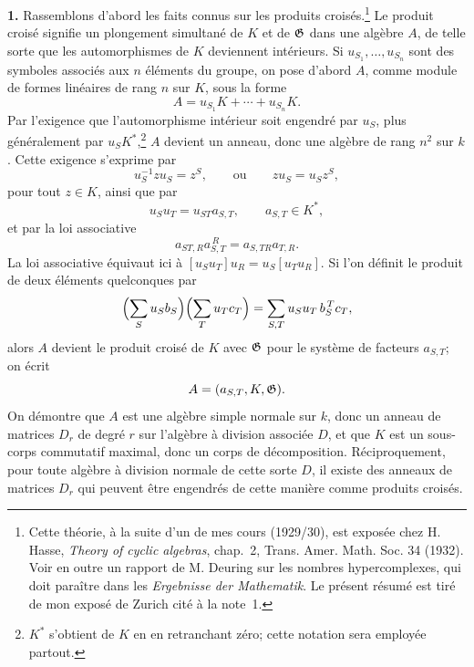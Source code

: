 \noindent\textbf{1.} Rassemblons d'abord les faits connus sur les produits croisés.\footnote{Cette théorie, à la suite d'un de mes cours (1929/30), est exposée chez H. Hasse, \emph{Theory of cyclic algebras}, chap.~2, Trans. Amer. Math. Soc. 34 (1932). Voir en outre un rapport de M. Deuring sur les nombres hypercomplexes, qui doit paraître dans les \emph{Ergebnisse der Mathematik}. Le présent résumé est tiré de mon exposé de Zurich cité à la note~1.} Le produit croisé signifie un plongement simultané de \(K\) et de \(\mathfrak G\) dans une algèbre \(A\), de telle sorte que les automorphismes de \(K\) deviennent intérieurs. Si \(u_{S_1},\ldots,u_{S_n}\) sont des symboles associés aux \(n\) éléments du groupe, on pose d'abord \(A\), comme module de formes linéaires de rang \(n\) sur \(K\), sous la forme
\[
        A=u_{S_1}K+\cdots+u_{S_n}K .                         \tag{1}
\]
Par l'exigence que l'automorphisme intérieur soit engendré par \(u_S\), plus généralement par \(u_S K^*\),\footnote{\(K^*\) s'obtient de \(K\) en en retranchant zéro; cette notation sera employée partout.} \(A\) devient un anneau, donc une algèbre de rang \(n^2\) sur \(k\). Cette exigence s'exprime par
\[
        u_S^{-1}zu_S=z^S,\qquad\text{ou}\qquad
        z u_S=u_S z^S,                                      \tag{2}
\]
pour tout \(z\in K\), ainsi que par
\[
        u_Su_T=u_{ST}a_{S,T},\qquad a_{S,T}\in K^*,           \tag{3}
\]
et par la loi associative
\[
        a_{ST,R}a_{S,T}^{\,R}=a_{S,TR}a_{T,R}.                \tag{4}
\]
La loi associative équivaut ici à \([u_Su_T]u_R=u_S[u_Tu_R]\).
Si l'on définit le produit de deux éléments quelconques par
\[
 \Bigl(\sum_S u_S b_S\Bigr)\Bigl(\sum_T u_T c_T\Bigr)
   =\sum_{S,T}u_Su_T\,b_S^{\,T}c_T ,
\]
alors \(A\) devient le produit croisé de \(K\) avec \(\mathfrak G\) pour le système de facteurs \(a_{S,T}\); on écrit
\[
        A=(a_{S,T},K,\mathfrak G).
\]
On démontre que \(A\) est une algèbre simple normale sur \(k\), donc un anneau de matrices \(D_r\) de degré \(r\) sur l'algèbre à division associée \(D\), et que \(K\) est un sous-corps commutatif maximal, donc un corps de décomposition. Réciproquement, pour toute algèbre à division normale de cette sorte \(D\), il existe des anneaux de matrices \(D_r\) qui peuvent être engendrés de cette manière comme produits croisés.

